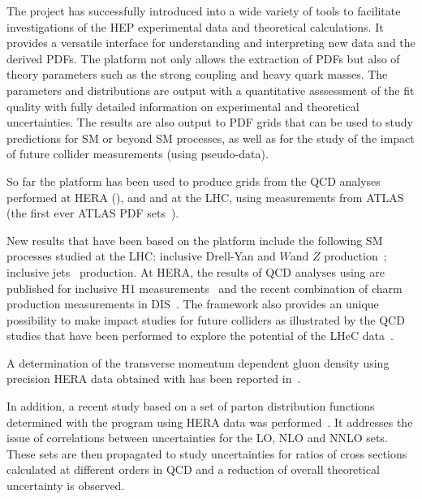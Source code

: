 The \fitter project has successfully introduced into a wide variety
of tools to facilitate investigations of the HEP experimental data
and theoretical calculations. It provides a versatile interface
for understanding and interpreting new data and the derived PDFs.
The \fitter platform not only allows the extraction of PDFs but also of theory 
parameters such as the strong coupling and heavy quark masses. The parameters and distributions are output with a
quantitative asssessment of the fit quality with fully detailed information on 
experimental and theoretical uncertainties.
The results are also output to PDF \lhapdf grids that can be used to study predictions for SM or beyond SM processes, as well as for the study of the impact of 
future collider measurements (using pseudo-data).


So far the \fitter platform has been used to produce grids 
from the QCD analyses performed at 
HERA (\cite{h1zeus:2009wt}), and and at the LHC, using 
measurements from ATLAS~\cite{atlas:strange,atlas:jets} (the first ever ATLAS PDF sets~\cite{atlas:grids}).

New results that have been based on the \fitter platform include 
the following SM processes 
studied at the LHC:  inclusive Drell-Yan and $W$and $Z$ 
production~\cite{atlas:strange,atlas:hm,cms:strange};
inclusive jets~\cite{atlas:jets,cms:jets} production.
At HERA, the results of QCD analyses using \fitter are 
published for inclusive H1 measurements~\cite{h1:2012kk}
and the recent combination of charm production measurements 
in DIS~\cite{h1zeus:charm}.
The \fitter framework also provides an unique possibility to 
make impact studies for future colliders
as illustrated by the QCD studies that have been performed to 
explore the potential of the LHeC data~\cite{lhec:studies}.

A determination of the transverse momentum dependent gluon density using precision HERA
data obtained with \fitter has been reported in~\cite{Jung2014}. 

In addition, a recent study based on a set of parton distribution functions 
determined with the \fitter program using HERA data was performed~\cite{hfcorrpaper}.
It addresses the issue of correlations between uncertainties for the LO,
NLO and NNLO sets. These sets are then propagated to study uncertainties 
for ratios of cross sections calculated at different orders in QCD and  
a reduction of overall theoretical uncertainty is observed.

